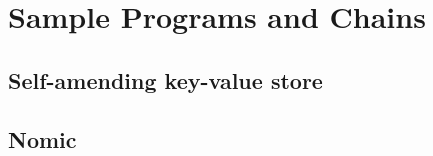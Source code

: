 \section{Sample Programs and Chains}

\subsection{Self-amending key-value store}

\subsection{Nomic}
\label{s:examples}
